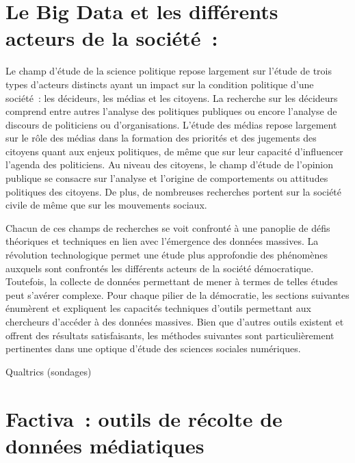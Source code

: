 \documentclass[
  letterpaper,
]{scrbook}
\begin{document}
\hypertarget{le-big-data-et-les-diffuxe9rents-acteurs-de-la-sociuxe9tuxe9}{%
\section{\texorpdfstring{\textbf{Le Big Data et les différents acteurs
de la
société~:}}{Le Big Data et les différents acteurs de la société~:}}\label{le-big-data-et-les-diffuxe9rents-acteurs-de-la-sociuxe9tuxe9}}

Le champ d'étude de la science politique repose largement sur l'étude de
trois types d'acteurs distincts ayant un impact sur la condition
politique d'une société~: les décideurs, les médias et les citoyens. La
recherche sur les décideurs comprend entre autres l'analyse des
politiques publiques ou encore l'analyse de discours de politiciens ou
d'organisations. L'étude des médias repose largement sur le rôle des
médias dans la formation des priorités et des jugements des citoyens
quant aux enjeux politiques, de même que sur leur capacité d'influencer
l'agenda des politiciens. Au niveau des citoyens, le champ d'étude de
l'opinion publique se consacre sur l'analyse et l'origine de
comportements ou attitudes politiques des citoyens. De plus, de
nombreuses recherches portent sur la société civile de même que sur les
mouvements sociaux.

Chacun de ces champs de recherches se voit confronté à une panoplie de
défis théoriques et techniques en lien avec l'émergence des données
massives. La révolution technologique permet une étude plus approfondie
des phénomènes auxquels sont confrontés les différents acteurs de la
société démocratique. Toutefois, la collecte de données permettant de
mener à termes de telles études peut s'avérer complexe. Pour chaque
pilier de la démocratie, les sections suivantes énumèrent et expliquent
les capacités techniques d'outils permettant aux chercheurs d'accéder à
des données massives. Bien que d'autres outils existent et offrent des
résultats satisfaisants, les méthodes suivantes sont particulièrement
pertinentes dans une optique d'étude des sciences sociales numériques.

Qualtrics (sondages)

\hypertarget{factiva-outils-de-ruxe9colte-de-donnuxe9es-muxe9diatiques}{%
\section{\texorpdfstring{\textbf{Factiva~: outils de récolte de données
médiatiques}}{Factiva~: outils de récolte de données médiatiques}}\label{factiva-outils-de-ruxe9colte-de-donnuxe9es-muxe9diatiques}}
\end{document}

